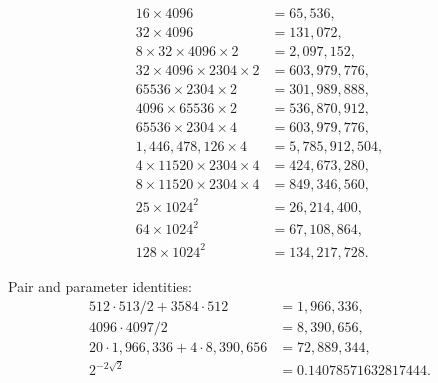 \documentclass[11pt]{article}
\begin{document}
\begin{align*}
16\times 4096 &= 65{,}536,\\
32\times 4096 &= 131{,}072,\\
8\times 32\times 4096\times 2 &= 2{,}097{,}152,\\
32\times 4096\times 2304\times 2 &= 603{,}979{,}776,\\
65536\times 2304\times 2 &= 301{,}989{,}888,\\
4096\times 65536\times 2 &= 536{,}870{,}912,\\
65536\times 2304\times 4 &= 603{,}979{,}776,\\
1{,}446{,}478{,}126\times 4 &= 5{,}785{,}912{,}504,\\
4\times 11520\times 2304\times 4 &= 424{,}673{,}280,\\
8\times 11520\times 2304\times 4 &= 849{,}346{,}560,\\
25\times 1024^{2} &= 26{,}214{,}400,\\
64\times 1024^{2} &= 67{,}108{,}864,\\
128\times 1024^{2} &= 134{,}217{,}728.
\end{align*}

Pair and parameter identities:
\begin{align*}
512\cdot 513/2 + 3584\cdot 512 &= 1{,}966{,}336,\\
4096\cdot 4097/2 &= 8{,}390{,}656,\\
20\cdot 1{,}966{,}336 + 4\cdot 8{,}390{,}656 &= 72{,}889{,}344,\\
2^{-2\sqrt{2}} &= 0.14078571632817444.
\end{align*}
\end{document}
